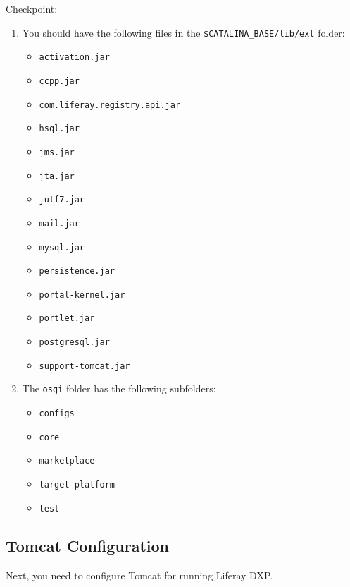 Checkpoint:

\begin{enumerate}
\def\labelenumi{\arabic{enumi}.}
\item
  You should have the following files in the
  \texttt{\$CATALINA\_BASE/lib/ext} folder:

  \begin{itemize}
  \tightlist
  \item
    \texttt{activation.jar}
  \item
    \texttt{ccpp.jar}
  \item
    \texttt{com.liferay.registry.api.jar}
  \item
    \texttt{hsql.jar}
  \item
    \texttt{jms.jar}
  \item
    \texttt{jta.jar}
  \item
    \texttt{jutf7.jar}
  \item
    \texttt{mail.jar}
  \item
    \texttt{mysql.jar}
  \item
    \texttt{persistence.jar}
  \item
    \texttt{portal-kernel.jar}
  \item
    \texttt{portlet.jar}
  \item
    \texttt{postgresql.jar}
  \item
    \texttt{support-tomcat.jar}
  \end{itemize}
\item
  The \texttt{osgi} folder has the following subfolders:

  \begin{itemize}
  \tightlist
  \item
    \texttt{configs}
  \item
    \texttt{core}
  \item
    \texttt{marketplace}
  \item
    \texttt{target-platform}
  \item
    \texttt{test}
  \end{itemize}
\end{enumerate}

\subsection{Tomcat Configuration}\label{tomcat-configuration}

Next, you need to configure Tomcat for running Liferay DXP.

